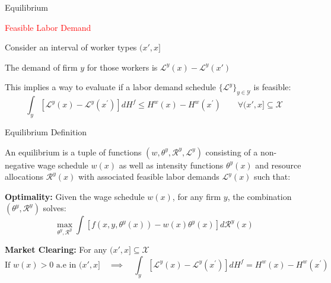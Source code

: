 \documentclass[notes,11pt, aspectratio=169]{beamer}
\newenvironment{wideitemize}{\itemize\addtolength{\itemsep}{10pt}}{\enditemize}
\begin{document}
\begin{frame}{Equilibrium}
	\begin{wideitemize}
		\item \textcolor{red}{Feasible Labor Demand}
		\begin{wideitemize}
			\item Consider an interval of worker types $(x',x]$
			\item The demand of firm $y$ for those workers is $\mathcal{L}^y(x) - \mathcal{L}^y(x')$
			\pause
			\item This implies a way to evaluate if a labor demand schedule $\{\mathcal{L}^y\}_{y\in \mathcal{Y}}$ is feasible:\[\int_{y}\left[\mathcal{L}^{y}(x)-\mathcal{L}^{y}\left(x^{\prime}\right)\right] d H^{f} \leq H^{w}(x)-H^{w}\left(x^{\prime}\right) \qquad \forall  (x',x]\subseteq\mathcal{X}\]
		\end{wideitemize}
	\end{wideitemize}
\end{frame}

\begin{frame}{Equilibrium Definition}
	\begin{wideitemize}
		\item An equilibrium is a tuple of functions $\left(w, \theta^{y}, \mathcal{R}^{y}, \mathcal{L}^{y}\right)$ consisting of a non-negative wage schedule $w(x)$ as well as intensity functions $\theta^{y}(x)$ and resource allocations $\mathcal{R}^{y}(x)$ with associated feasible labor demands $\mathcal{L}^{y}(x)$ such that:
		\pause
		\begin{wideitemize}
			\item \textbf{Optimality:} Given the wage schedule $w(x)$, for any firm $y$, the combination $\left(\theta^{y}, \mathcal{R}^{y}\right)$ solves:$$\max _{\theta^y, \mathcal{R}^{y}} \int\left[f\left(x, y, \theta^{y}(x)\right)-w(x) \theta^{y}(x)\right] d \mathcal{R}^{y}(x)$$
			\pause
			\item \textbf{Market Clearing:} For any $(x',x]\subseteq\mathcal{X}$
			\[\text{If } w(x)>0 \text{ a.e in } (x', x]  \quad \implies \quad   \int_{y}\left[\mathcal{L}^{y}(x)-\mathcal{L}^{y}\left(x^{\prime}\right)\right] d H^{f} = H^{w}(x)-H^{w}\left(x^{\prime}\right) \]
		\end{wideitemize}
	\end{wideitemize}
\end{frame}
\end{document}
